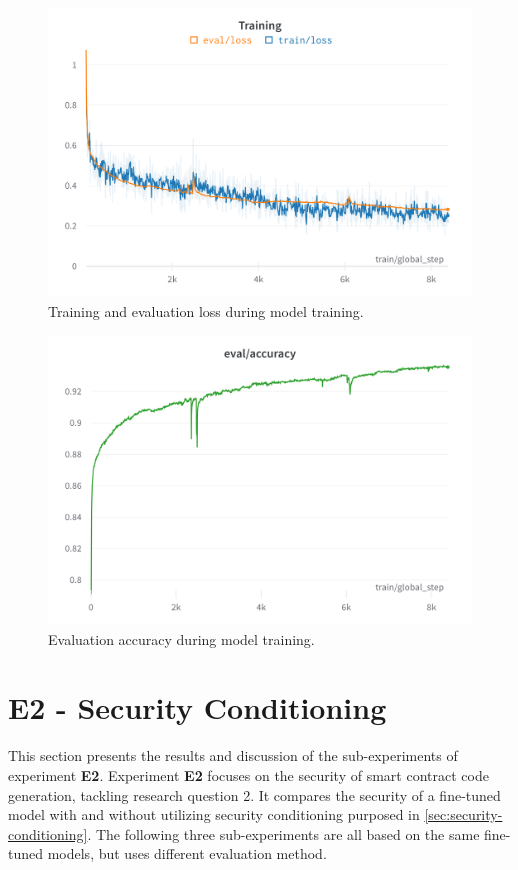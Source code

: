 \begin{figure}[htp]
    \centering
    \includegraphics[width=\textwidth]{figures/wandb-train-loss-gpt-j-smart-contract.png}
    \caption{Training and evaluation loss during model training.}
\end{figure}

\begin{figure}[htp]
    \centering
    \includegraphics[width=\textwidth]{figures/wandb-train-eval-gpt-j-smart-contract.png}
    \caption{Evaluation accuracy during model training.}
\end{figure}


\section{E2 - Security Conditioning}
\label{sec:e2-security-conditioning}
This section presents the results and discussion of the sub-experiments of experiment \textbf{E2}. Experiment \textbf{E2} focuses on the security of smart contract code generation, tackling research question 2. It compares the security of a fine-tuned model with and without utilizing security conditioning purposed in \cref{sec:security-conditioning}. The following three sub-experiments are all based on the same fine-tuned models, but uses different evaluation method.

